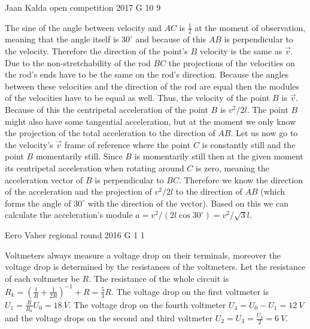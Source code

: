 \documentclass[11pt]{article}
\begin{document}
{Jaan Kalda} %
{open competition} %
{2017} %
{G 10} %
{9} %
{

\ifEngSolution
The sine of the angle between velocity and $AC$ is $\frac 12$ at the moment of observation, meaning that the angle itself is $30^\circ$ and because of this $AB$ is perpendicular to the velocity. Therefore the direction of the point’s $B$ velocity is the same as $\vec v$. Due to the non-stretchability of the rod $BC$ the projections of the velocities on the rod’s ends have to be the same on the rod’s direction. Because the angles between these velocities and the direction of the rod are equal then the modules of the velocities have to be equal as well. Thus, the velocity of the point $B$ is $\vec v$. Because of this the centripetal acceleration of the point $B$ is $v^2/2l$. The point $B$ might also have some tangential acceleration, but at the moment we only know the projection of the total acceleration to the direction of $AB$. Let us now go to the velocity’s $\vec v$ frame of reference where the point $C$ is constantly still and the point $B$ momentarily still. Since $B$ is momentarily still then at the given moment its centripetal acceleration when rotating around $C$ is zero, meaning the acceleration vector of $B$ is perpendicular to $BC$. Therefore we know the direction of the acceleration and the projection of $v^2/2l$ to the direction of $AB$ (which forms the angle of $30^\circ$ with the direction of the vector). Based on this we can calculate the acceleration’s module $a=v^2/(2l\cos30^\circ)=v^2/\sqrt 3l$.
\fi
}

{Eero Vaher} %
{regional round} %
{2016} %
{G 1} %
{1} %
{

\ifEngSolution
Voltmeters always measure a voltage drop on their terminals, moreover the voltage drop is determined by the resistances of the voltmeters. Let the resistance of each voltmeter be $R$. The resistance of the whole circuit is $R_k=\left(\frac{1}{R}+\frac{1}{2R}\right)^{-1}+R=\frac{5}{3}R$. The voltage drop on the first voltmeter is $U_1=\frac{R}{R_k}U_0=\SI{18}{V}$. The voltage drop on the fourth voltmeter $U_4=U_0-U_1=\SI{12}{V}$ and the voltage drops on the second and third voltmeter $U_2=U_3=\frac{U_4}{2}=\SI{6}{V}$.
\fi
}
\end{document}
